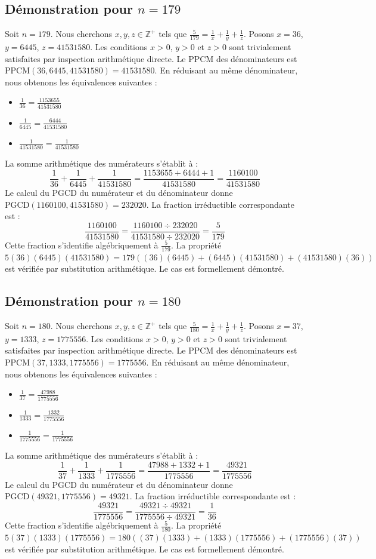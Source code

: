 \documentclass[12pt,a4paper]{article}
\begin{document}
\subsection{Démonstration pour $n = 179$}
Soit $n = 179$. Nous cherchons $x, y, z \in \mathbb{Z}^{+}$ tels que $\frac{5}{179} = \frac{1}{x} + \frac{1}{y} + \frac{1}{z}$.
Posons $x = 36$, $y = 6445$, $z = 41531580$.
Les conditions $x > 0$, $y > 0$ et $z > 0$ sont trivialement satisfaites par inspection arithmétique directe.
Le PPCM des dénominateurs est $\text{PPCM}(36, 6445, 41531580) = 41531580$.
En réduisant au même dénominateur, nous obtenons les équivalences suivantes :
\begin{itemize}
    \item $\frac{1}{36} = \frac{1153655}{41531580}$
    \item $\frac{1}{6445} = \frac{6444}{41531580}$
    \item $\frac{1}{41531580} = \frac{1}{41531580}$
\end{itemize}
La somme arithmétique des numérateurs s'établit à :
$$ \frac{1}{36} + \frac{1}{6445} + \frac{1}{41531580} = \frac{1153655 + 6444 + 1}{41531580} = \frac{1160100}{41531580} $$
Le calcul du PGCD du numérateur et du dénominateur donne $\text{PGCD}(1160100, 41531580) = 232020$.
La fraction irréductible correspondante est :
$$ \frac{1160100}{41531580} = \frac{1160100 \div 232020}{41531580 \div 232020} = \frac{5}{179} $$
Cette fraction s'identifie algébriquement à $\frac{5}{179}$.
La propriété $5(36)(6445)(41531580) = 179((36)(6445) + (6445)(41531580) + (41531580)(36))$ est vérifiée par substitution arithmétique.
Le cas est formellement démontré.

\subsection{Démonstration pour $n = 180$}
Soit $n = 180$. Nous cherchons $x, y, z \in \mathbb{Z}^{+}$ tels que $\frac{5}{180} = \frac{1}{x} + \frac{1}{y} + \frac{1}{z}$.
Posons $x = 37$, $y = 1333$, $z = 1775556$.
Les conditions $x > 0$, $y > 0$ et $z > 0$ sont trivialement satisfaites par inspection arithmétique directe.
Le PPCM des dénominateurs est $\text{PPCM}(37, 1333, 1775556) = 1775556$.
En réduisant au même dénominateur, nous obtenons les équivalences suivantes :
\begin{itemize}
    \item $\frac{1}{37} = \frac{47988}{1775556}$
    \item $\frac{1}{1333} = \frac{1332}{1775556}$
    \item $\frac{1}{1775556} = \frac{1}{1775556}$
\end{itemize}
La somme arithmétique des numérateurs s'établit à :
$$ \frac{1}{37} + \frac{1}{1333} + \frac{1}{1775556} = \frac{47988 + 1332 + 1}{1775556} = \frac{49321}{1775556} $$
Le calcul du PGCD du numérateur et du dénominateur donne $\text{PGCD}(49321, 1775556) = 49321$.
La fraction irréductible correspondante est :
$$ \frac{49321}{1775556} = \frac{49321 \div 49321}{1775556 \div 49321} = \frac{1}{36} $$
Cette fraction s'identifie algébriquement à $\frac{5}{180}$.
La propriété $5(37)(1333)(1775556) = 180((37)(1333) + (1333)(1775556) + (1775556)(37))$ est vérifiée par substitution arithmétique.
Le cas est formellement démontré.
\end{document}
